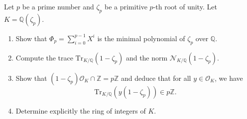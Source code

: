 \begin{exercise}
\label{algebra:2022:5}
Let $p$ be a prime number and $\zeta_p$ be a primitive $p$-th root of unity. Let $K = \mathbb{Q}(\zeta_p)$.

\begin{enumerate}
\item[(a)] Show that $\Phi_p = \sum_{i=0}^{p-1} X^i$ is the minimal polynomial of $\zeta_p$ over $\mathbb{Q}$.

\item[(b)] Compute the trace $\mathrm{Tr}_{K/\mathbb{Q}}(1 - \zeta_p)$ and the norm $\mathcal{N}_{K/\mathbb{Q}}(1 - \zeta_p)$.

\item[(c)] Show that $(1 - \zeta_p)\mathcal{O}_K \cap \mathbb{Z} = p\mathbb{Z}$ and deduce that for all $y \in \mathcal{O}_K$, we have
$$\mathrm{Tr}_{K/\mathbb{Q}}(y(1 - \zeta_p)) \in p\mathbb{Z}.$$

\item[(d)] Determine explicitly the ring of integers of $K$.
\end{enumerate}
\end{exercise}

